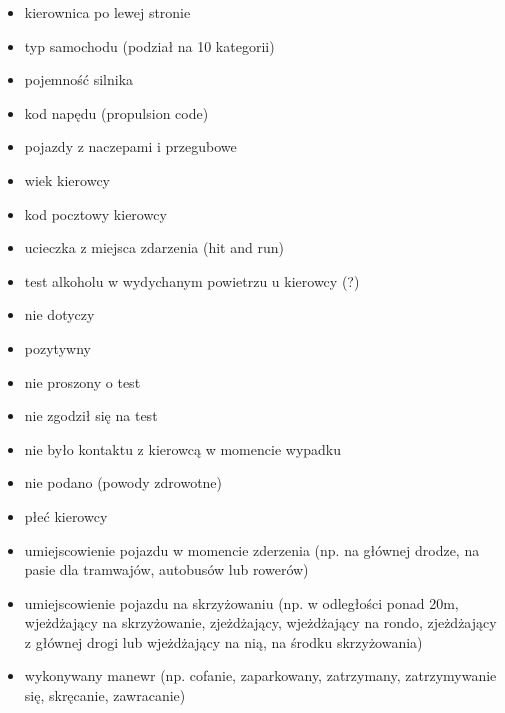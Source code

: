 \begin{itemize}
\itemsep1pt\parskip0pt
\item
  kierownica po lewej stronie\\
\item
  typ samochodu (podział na 10 kategorii)\\
\item
  pojemność silnika\\
\item
  kod napędu (propulsion code)\\
\item
  pojazdy z naczepami i przegubowe\\
\item
  wiek kierowcy\\
\item
  kod pocztowy kierowcy\\
\item
  ucieczka z miejsca zdarzenia (hit and run)\\
\item
  test alkoholu w wydychanym powietrzu u kierowcy (?)\\
\item
  nie dotyczy\\
\item
  pozytywny\\
\item
  nie proszony o test\\
\item
  nie zgodził się na test\\
\item
  nie było kontaktu z kierowcą w momencie wypadku\\
\item
  nie podano (powody zdrowotne)\\
\item
  płeć kierowcy\\
\item
  umiejscowienie pojazdu w momencie zderzenia (np. na głównej drodze, na
  pasie dla tramwajów, autobusów lub rowerów)\\
\item
  umiejscowienie pojazdu na skrzyżowaniu (np. w odległości ponad 20m,
  wjeżdżający na skrzyżowanie, zjeżdżający, wjeżdżający na rondo,
  zjeżdżający z głównej drogi lub wjeżdżający na nią, na środku
  skrzyżowania)\\
\item
  wykonywany manewr (np. cofanie, zaparkowany, zatrzymany, zatrzymywanie
  się, skręcanie, zawracanie)\\

\end{itemize}
